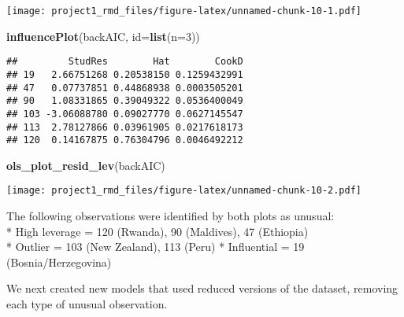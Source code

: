 \documentclass[
]{article}
\newenvironment{Shaded}{\begin{snugshade}}{\end{snugshade}}
\newcommand{\CommentTok}[1]{\textcolor[rgb]{0.56,0.35,0.01}{\textit{#1}}}
\newcommand{\DataTypeTok}[1]{\textcolor[rgb]{0.13,0.29,0.53}{#1}}
\newcommand{\DecValTok}[1]{\textcolor[rgb]{0.00,0.00,0.81}{#1}}
\newcommand{\KeywordTok}[1]{\textcolor[rgb]{0.13,0.29,0.53}{\textbf{#1}}}
\newcommand{\NormalTok}[1]{#1}
\newcommand{\OperatorTok}[1]{\textcolor[rgb]{0.81,0.36,0.00}{\textbf{#1}}}
\newcommand{\StringTok}[1]{\textcolor[rgb]{0.31,0.60,0.02}{#1}}
\begin{document}
\texttt{[image: project1\_rmd\_files/figure-latex/unnamed-chunk-10-1.pdf]}

\begin{Shaded}
\begin{Highlighting}[]
\KeywordTok{influencePlot}\NormalTok{(backAIC, }\DataTypeTok{id=}\KeywordTok{list}\NormalTok{(}\DataTypeTok{n=}\DecValTok{3}\NormalTok{)) }
\end{Highlighting}
\end{Shaded}

\begin{verbatim}
##         StudRes        Hat        CookD
## 19   2.66751268 0.20538150 0.1259432991
## 47   0.07737851 0.44868938 0.0003505201
## 90   1.08331865 0.39049322 0.0536400049
## 103 -3.06088780 0.09027770 0.0627145547
## 113  2.78127866 0.03961905 0.0217618173
## 120  0.14167875 0.76304796 0.0046492212
\end{verbatim}

\begin{Shaded}
\begin{Highlighting}[]
\KeywordTok{ols_plot_resid_lev}\NormalTok{(backAIC)}
\end{Highlighting}
\end{Shaded}

\texttt{[image: project1\_rmd\_files/figure-latex/unnamed-chunk-10-2.pdf]}

The following observations were identified by both plots as unusual:\\
* High leverage = 120 (Rwanda), 90 (Maldives), 47 (Ethiopia)\\
* Outlier = 103 (New Zealand), 113 (Peru) * Influential = 19
(Bosnia/Herzegovina)

We next created new models that used reduced versions of the dataset,
removing each type of unusual observation.

\begin{Shaded}
\end{Shaded}
\end{document}
